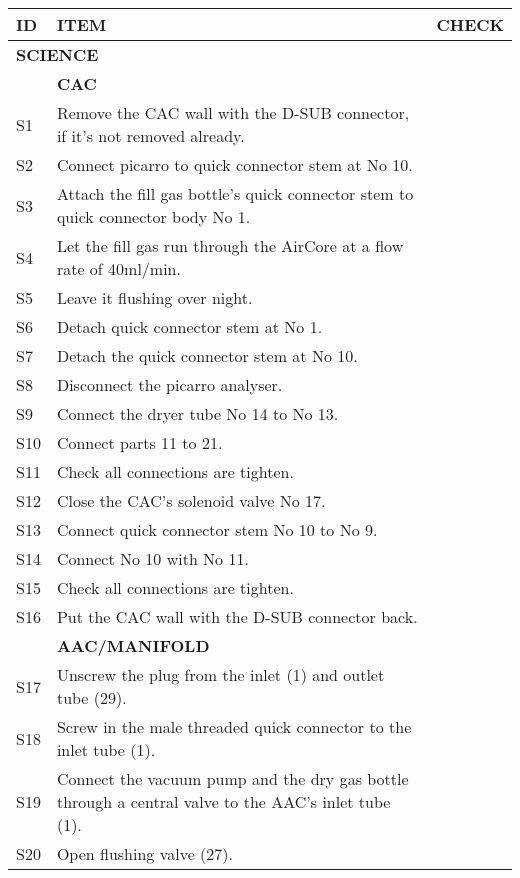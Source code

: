 


\begin{longtable} {|m{}|m{}|m{}|}
\hline
\textbf{ID} & \textbf{ITEM} & \textbf{CHECK} \\
\hline
\multicolumn{2}{|l|}{ \textbf{SCIENCE} } & \\
\hline
& \textbf{CAC} & \\
\hline
S1 & Remove the CAC wall with the D-SUB connector, if it's not removed already. & \\ \hline
S2 & Connect picarro to quick connector stem at No 10. & \\ \hline
S3 & Attach the fill gas bottle's quick connector stem to quick connector body No 1. & \\ \hline
S4 & Let the fill gas run through the AirCore at a flow rate of 40ml/min. & \\ \hline
S5 & Leave it flushing over night. & \\ \hline
S6 & Detach quick connector stem at No 1. & \\ \hline
S7 & Detach the quick connector stem at No 10. & \\ \hline
S8 & Disconnect the picarro analyser. & \\ \hline
S9 & Connect the dryer tube No 14 to No 13. & \\ \hline
S10 & Connect parts 11 to 21. & \\ \hline
S11 & Check all connections are tighten. & \\ \hline
S12 & Close the CAC's solenoid valve No 17. & \\ \hline
S13 & Connect quick connector stem No 10 to No 9. & \\ \hline
S14 & Connect No 10 with No 11. & \\ \hline
S15 & Check all connections are tighten. & \\ \hline
S16 & Put the CAC wall with the D-SUB connector back. & \\ \hline
& \textbf{AAC/MANIFOLD} & \\ \hline
S17 & Unscrew the plug from the inlet (1) and outlet tube (29). & \\ \hline
S18 & Screw in the male threaded quick connector to the inlet tube (1). & \\ \hline
S19 & Connect the vacuum pump and the dry gas bottle through a central valve to the AAC's inlet tube (1). & \\ \hline
S20 & Open flushing valve (27). & \\ \hline

\end{longtable}
